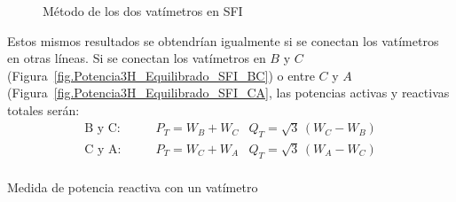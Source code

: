 \documentclass[11pt]{book} %
\makeatletter
\numberwithin{dummy}{section}
\theoremstyle{ocrenumbox}
\theoremstyle{blacknumex}
\theoremstyle{blacknumbox}
\theoremstyle{ocrenum}
\renewcommand{\subsection}{\@startsection {subsection}{2}{\z@}
{-3ex \@plus -0.1ex \@minus -.4ex}
{0.5ex \@plus.2ex }
{\normalfont\sffamily\bfseries}}
\makeatother
\begin{document}
\begin{figure}[htbp]
    \centering
    \hfill
    \caption{Método de los dos vatímetros en SFI}
\end{figure}
Estos mismos resultados se obtendrían igualmente si se conectan los vatímetros en otras líneas. Si se conectan los vatímetros en $B$ y $C$ (Figura~\ref{fig.Potencia3H_Equilibrado_SFI_BC}) o entre $C$ y $A$ (Figura~\ref{fig.Potencia3H_Equilibrado_SFI_CA}, las potencias activas y reactivas totales serán: 
\begin{align*}
    \text{B y C}: &\qquad P_T=W_B + W_C  &Q_T=\sqrt{3}\,(W_C - W_B)\\
    \text{C y A}: &\qquad P_T=W_C + W_A  &Q_T=\sqrt{3}\,(W_A - W_C)\\
\end{align*}


\subsection{Medida de potencia reactiva con un vatímetro}
\end{document}
